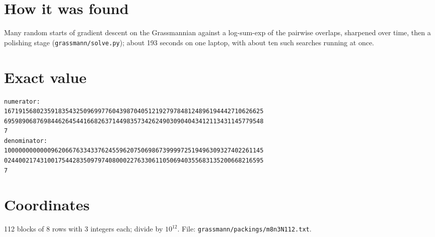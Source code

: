 \documentclass[11pt,a4paper]{article}
\begin{document}
\section{How it was found}
Many random starts of gradient descent on the Grassmannian against a log-sum-exp of the pairwise overlaps, sharpened over time, then a polishing stage (\texttt{grassmann/solve.py}); about 193 seconds on one laptop, with about ten such searches running at once.


\appendix
\section{Exact value}
{\small
\begin{verbatim}
numerator:
167191568023591835432509699776043987040512192797848124896194442710626625
695989068769844626454416682637144983573426249030904043412113431145779548
7
denominator:
100000000000096206676334337624559620750698673999972519496309327402261145
024400217431001754428350979740800022763306110506940355683135200668216595
7
\end{verbatim}}

\section{Coordinates}
112 blocks of 8 rows with 3 integers each; divide by $10^{12}$. File: \texttt{grassmann/packings/m8n3N112.txt}.
{\tiny
\begin{multicols}{3}
\end{multicols}}
\end{document}
